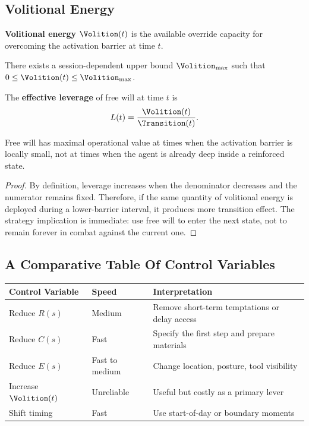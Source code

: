 \subsection{Volitional Energy}

\begin{definition}
\textbf{Volitional energy} $\Volition(t)$ is the available override capacity
for overcoming the activation barrier at time $t$.
\end{definition}

\begin{axiom}
There exists a session-dependent upper bound $\Volition_{\max}$ such that
$0 \leq \Volition(t) \leq \Volition_{\max}$.
\end{axiom}

\begin{definition}
The \textbf{effective leverage} of free will at time $t$ is
\[
  L(t) = \frac{\Volition(t)}{\Transition(t)}.
\]
\end{definition}

\begin{theorem}
Free will has maximal operational value at times when the activation barrier is
locally small, not at times when the agent is already deep inside a reinforced
state.
\end{theorem}

\begin{proof}
By definition, leverage increases when the denominator decreases and the
numerator remains fixed. Therefore, if the same quantity of volitional energy is
deployed during a lower-barrier interval, it produces more transition effect.
The strategy implication is immediate: use free will to enter the next state,
not to remain forever in combat against the current one.
\end{proof}

\subsection{A Comparative Table Of Control Variables}

\begin{center}
\renewcommand{\arraystretch}{1.25}
\begin{tabular}{@{}p{} p{} p{}@{}}
\toprule
\textbf{Control Variable} & \textbf{Speed} & \textbf{Interpretation} \\
\midrule
Reduce $R(s)$ & Medium & Remove short-term temptations or delay access \\
Reduce $C(s)$ & Fast & Specify the first step and prepare materials \\
Reduce $E(s)$ & Fast to medium & Change location, posture, tool visibility \\
Increase $\Volition(t)$ & Unreliable & Useful but costly as a primary lever \\
Shift timing & Fast & Use start-of-day or boundary moments \\
\bottomrule
\end{tabular}
\end{center}

